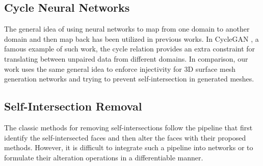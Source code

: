 \subsection{Cycle Neural Networks}
The general idea of using neural networks to map from one domain to another domain and then map back has been utilized in previous works. In CycleGAN \cite{CycleGAN2017}, a famous example of such work, the cycle relation provides an extra constraint for translating between unpaired data from different domains. In comparison, our work uses the same general idea to enforce injectivity for 3D surface mesh generation networks and trying to prevent self-intersection in generated meshes. 

\subsection{Self-Intersection Removal}
The classic methods  for removing self-intersections follow the pipeline that first identify the self-intersected faces and then alter the faces with their proposed methods. However, it is difficult to integrate such a pipeline into networks or to formulate their alteration operations in a differentiable manner. 

